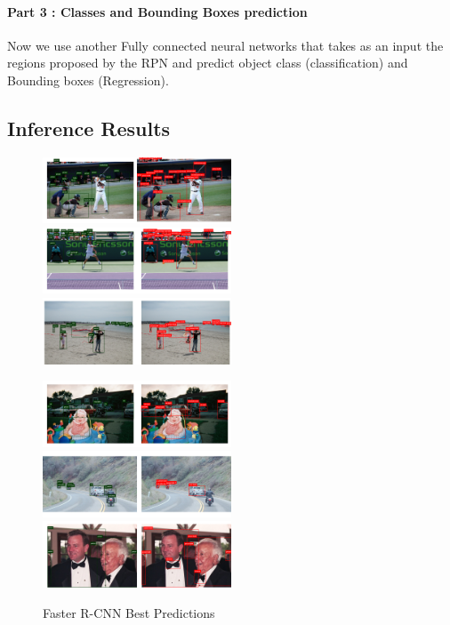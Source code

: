 \documentclass[12pt]{article}
\begin{document}
\paragraph{Part 3 : Classes and Bounding Boxes prediction}

Now we use another Fully connected neural networks that takes as an input the regions proposed by the RPN and predict object class (classification) and Bounding boxes (Regression).


\subsection{Inference Results}

\begin{figure}[htbp]
    {\raggedright
    \includegraphics[width=0.5\textwidth]{images/rcnn_res/rcnn_b1.png}
    \includegraphics[width=0.5\textwidth]{images/rcnn_res/rcnn_b2.png}
    \includegraphics[width=0.5\textwidth]{images/rcnn_res/rcnn_b3.png}}
    {\raggedleft
    \includegraphics[width=0.5\textwidth]{images/rcnn_res/rcnn_b4.png}
    \includegraphics[width=0.5\textwidth]{images/rcnn_res/rcnn_b5.png}
    \includegraphics[width=0.5\textwidth]{images/rcnn_res/rcnn_b6.png}}
    \caption{Faster R-CNN Best Predictions}
    \label{fig:rcnn2}
\end{figure}
\end{document}
